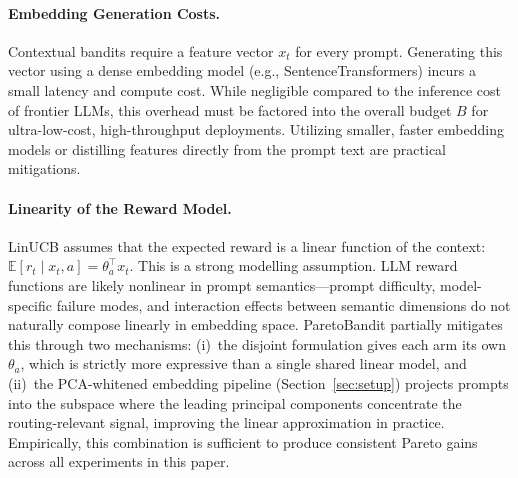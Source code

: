 \paragraph{Embedding Generation Costs.}
Contextual bandits require a feature vector $x_t$ for every prompt. Generating this vector using a dense embedding model (e.g., SentenceTransformers) incurs a small latency and compute cost. While negligible compared to the inference cost of frontier LLMs, this overhead must be factored into the overall budget $B$ for ultra-low-cost, high-throughput deployments. Utilizing smaller, faster embedding models or distilling features directly from the prompt text are practical mitigations.

\paragraph{Linearity of the Reward Model.}
LinUCB assumes that the expected reward is a linear function of the context: $\mathbb{E}[r_t \mid x_t, a] = \theta_a^\top x_t$.
This is a strong modelling assumption.
LLM reward functions are likely nonlinear in prompt semantics---prompt difficulty, model-specific failure modes, and interaction effects between semantic dimensions do not naturally compose linearly in embedding space.
ParetoBandit partially mitigates this through two mechanisms: (i)~the disjoint formulation gives each arm its own $\theta_a$, which is strictly more expressive than a single shared linear model, and (ii)~the PCA-whitened embedding pipeline (Section~\ref{sec:setup}) projects prompts into the subspace where the leading principal components concentrate the routing-relevant signal, improving the linear approximation in practice.
Empirically, this combination is sufficient to produce consistent Pareto gains across all experiments in this paper.

